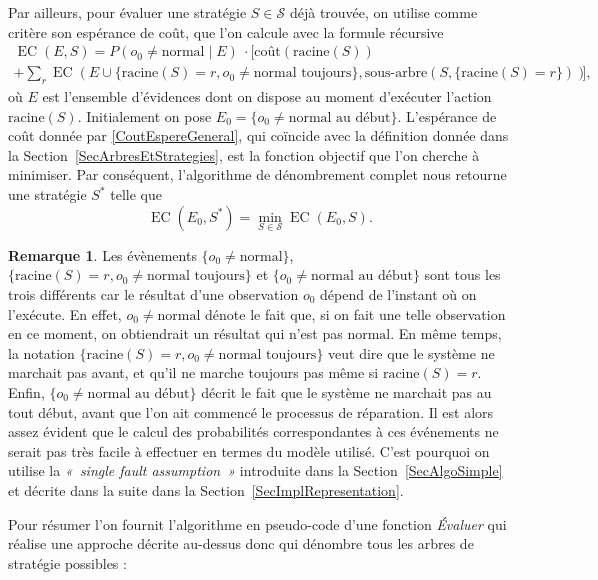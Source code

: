 \documentclass[a4paper,11pt]{article}
\theoremstyle{plain}
\theoremstyle{definition}
\newtheorem*{remk}{Remarque}
\DeclareMathOperator{\EC}{EC}
\begin{document}
Par ailleurs, pour évaluer une stratégie $S \in \mathcal S$ déjà trouvée, on utilise comme critère son espérance de coût, que l'on calcule avec la formule récursive
\begin{multline}
\label{CoutEspereGeneral}
\EC(E, S) = P(o_0 \neq \text{normal} \mid E) \: \cdot \Biggl[\text{coût}(\text{racine}(S)) \\ + \sum_{r} \EC(E \cup \{\text{racine}(S) = r, o_0 \neq \text{normal toujours}\}, \text{sous-arbre}(S, \{\text{racine}(S) = r\}))\Biggr],
\end{multline}
où $E$ est l'ensemble d'évidences dont on dispose au moment d'exécuter l'action $\text{racine}(S)$. Initialement on pose $E_0 = \{o_0 \neq \text{normal au début}\}$. L'espérance de coût donnée par \eqref{CoutEspereGeneral}, qui coïncide avec la définition donnée dans la Section~\ref{SecArbresEtStrategies}, est la fonction objectif que l'on cherche à minimiser. Par conséquent, l'algorithme de dénombrement complet nous retourne une stratégie $S^*$ telle que
\begin{equation}
\label{SolMainProblem}
\EC(E_0, S^*) = \min_{S \in \mathcal S} {\EC(E_0, S)}.
\end{equation}

\begin{remk}
Les évènements $\{o_0 \neq \text{normal}\}$, $\{\text{racine}(S) = r, o_0 \neq \text{normal toujours}\}$ et $\{o_0 \neq \text{normal }\allowbreak\text{au }\allowbreak\text{début}\}$ sont tous les trois différents car le résultat d'une observation $o_0$ dépend de l'instant où on l'exécute. En effet, $o_0 \neq \text{normal}$ dénote le fait que, si on fait une telle observation en ce moment, on obtiendrait un résultat qui n'est pas $\text{normal}$. En même temps, la notation $\{\text{racine}(S) = r, o_0 \neq \text{normal toujours}\}$ veut dire que le système ne marchait pas avant, et qu'il ne marche toujours pas même si $\text{racine}(S) = r$. Enfin, $\{o_0 \neq \text{normal au début}\}$ décrit le fait que le système ne marchait pas au tout début, avant que l'on ait commencé le processus de réparation. Il est alors assez évident que le calcul des probabilités correspondantes à ces événements ne serait pas très facile à effectuer en termes du modèle utilisé. C'est pourquoi on utilise la \emph{«~single fault assumption~»} introduite dans la Section~\ref{SecAlgoSimple} et décrite dans la suite dans la Section~\ref{SecImplRepresentation}.
\end{remk}

Pour résumer l'on fournit l'algorithme en pseudo-code d'une fonction \emph{Évaluer} qui réalise une approche décrite au-dessus donc qui dénombre tous les arbres de stratégie possibles :
\end{document}

